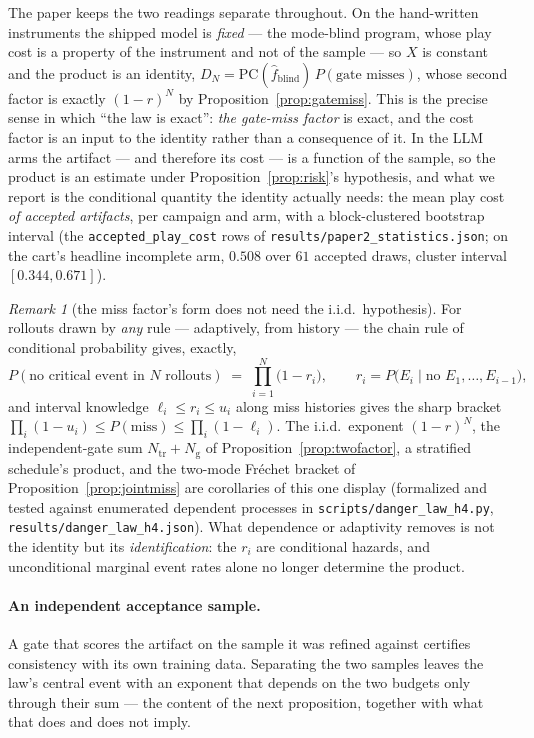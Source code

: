 \documentclass[11pt]{article}
\theoremstyle{definition}
\theoremstyle{remark}
\newtheorem{remark}{Remark}
\begin{document}
The paper keeps the two readings separate throughout. On the hand-written instruments the shipped model is \emph{fixed} --- the mode-blind program, whose play cost is a property of the instrument and not of the sample --- so $X$ is constant and the product is an identity, $D_N = \mathrm{PC}(\hat f_{\mathrm{blind}})\,P(\text{gate misses})$, whose second factor is exactly $(1-r)^N$ by Proposition~\ref{prop:gatemiss}. This is the precise sense in which ``the law is exact'': \emph{the gate-miss factor} is exact, and the cost factor is an input to the identity rather than a consequence of it. In the LLM arms the artifact --- and therefore its cost --- is a function of the sample, so the product is an estimate under Proposition~\ref{prop:risk}'s hypothesis, and what we report is the conditional quantity the identity actually needs: the mean play cost \emph{of accepted artifacts}, per campaign and arm, with a block-clustered bootstrap interval (the \texttt{accepted\_play\_cost} rows of \texttt{results/\allowbreak paper2\_\allowbreak statistics.json}; on the cart's headline incomplete arm, $0.508$ over $61$ accepted draws, cluster interval $[0.344, 0.671]$).

\begin{remark}[the miss factor's form does not need the i.i.d.\ hypothesis]
\label{rem:adaptive}
For rollouts drawn by \emph{any} rule --- adaptively, from history --- the chain rule of conditional probability gives, exactly,
\[
  P(\text{no critical event in } N \text{ rollouts}) \;=\; \prod_{i=1}^{N} \bigl(1 - r_i\bigr),
  \qquad r_i = P\bigl(E_i \mid \text{no } E_1, \dots, E_{i-1}\bigr),
\]
and interval knowledge $\ell_i \leq r_i \leq u_i$ along miss histories gives the sharp bracket $\prod_i (1-u_i) \leq P(\text{miss}) \leq \prod_i (1-\ell_i)$. The i.i.d.\ exponent $(1-r)^N$, the independent-gate sum $N_{\mathrm{tr}} + N_{\mathrm{g}}$ of Proposition~\ref{prop:twofactor}, a stratified schedule's product, and the two-mode Fr\'echet bracket of Proposition~\ref{prop:jointmiss} are corollaries of this one display (formalized and tested against enumerated dependent processes in \texttt{scripts/\allowbreak danger\_\allowbreak law\_\allowbreak h4.py}, \texttt{results/\allowbreak danger\_\allowbreak law\_\allowbreak h4.json}). What dependence or adaptivity removes is not the identity but its \emph{identification}: the $r_i$ are conditional hazards, and unconditional marginal event rates alone no longer determine the product.
\end{remark}

\paragraph{An independent acceptance sample.} A gate that scores the artifact on the sample it was refined against certifies consistency with its own training data. Separating the two samples leaves the law's central event with an exponent that depends on the two budgets only through their sum --- the content of the next proposition, together with what that does and does not imply.
\end{document}
